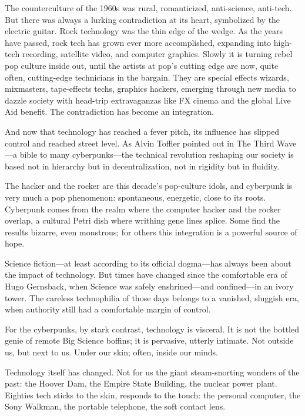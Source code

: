 The counterculture of the 1960s was rural, romanticized, anti-science, anti-tech. But there was always a lurking contradiction at its heart, symbolized by the electric guitar. Rock technology was the thin edge of the wedge. As the years have passed, rock tech has grown ever more accomplished, expanding into high-tech recording, satellite video, and computer graphics. Slowly it is turning rebel pop culture inside out, until the artists at pop's cutting edge are now, quite often, cutting-edge technicians in the bargain. They are special effects wizards, mixmasters, tape-effects techs, graphics hackers, emerging through new media to dazzle society with head-trip extravaganzas like FX cinema and the global Live Aid benefit. The contradiction has become an integration.

And now that technology has reached a fever pitch, its influence has slipped control and reached street level. As Alvin Toffler pointed out in The Third Wave---a bible to many cyberpunks---the technical revolution reshaping our society is based not in hierarchy but in decentralization, not in rigidity but in fluidity.

The hacker and the rocker are this decade's pop-culture idols, and cyberpunk is very much a pop phenomenon: spontaneous, energetic, close to its roots. Cyberpunk comes from the realm where the computer hacker and the rocker overlap, a cultural Petri dish where writhing gene lines splice. Some find the results bizarre, even monstrous; for others this integration is a powerful source of hope.

Science fiction---at least according to its official dogma---has always been about the impact of technology. But times have changed since the comfortable era of Hugo Gernsback, when Science was safely enshrined---and confined---in an ivory tower. The careless technophilia of those days belongs to a vanished, sluggish era, when authority still had a comfortable margin of control.

For the cyberpunks, by stark contrast, technology is visceral. It is not the bottled genie of remote Big Science boffins; it is pervasive, utterly intimate. Not outside us, but next to us. Under our skin; often, inside our minds.

Technology itself has changed. Not for us the giant steam-snorting wonders of the past: the Hoover Dam, the Empire State Building, the nuclear power plant. Eighties tech sticks to the skin, responds to the touch: the personal computer, the Sony Walkman, the portable telephone, the soft contact lens.

